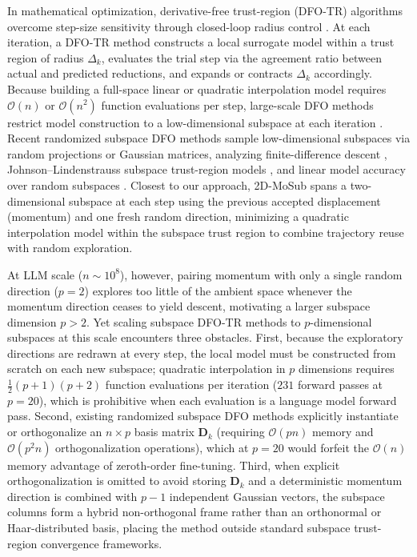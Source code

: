 \documentclass[smallextended]{svjour3}
\begin{document}
In mathematical optimization, derivative-free trust-region (DFO-TR) algorithms overcome step-size sensitivity through closed-loop radius control \cite{audet2017derivative,conn2000trust,conn2009introduction,Conn2009a,larson_menickelly_wild_2019,powell2006newuoa}. At each iteration, a DFO-TR method constructs a local surrogate model within a trust region of radius $\Delta_k$, evaluates the trial step via the agreement ratio between actual and predicted reductions, and expands or contracts $\Delta_k$ accordingly. Because building a full-space linear or quadratic interpolation model requires $\mathcal{O}(n)$ or $\mathcal{O}(n^2)$ function evaluations per step, large-scale DFO methods restrict model construction to a low-dimensional subspace at each iteration \cite{wang2006subspace,yuan2007subspace,yuan2014review}. Recent randomized subspace DFO methods sample low-dimensional subspaces via random projections or Gaussian matrices, analyzing finite-difference descent \cite{kozak2021stochastic,kozak2023zeroth}, Johnson--Lindenstrauss subspace trust-region models \cite{cartis2023scalable,cartis2024randomizedsubspacederivativefreeoptimization,dzahini2024stochastic}, and linear model accuracy over random subspaces \cite{hare2025expected,Menickelly2023}. Closest to our approach, 2D-MoSub \cite{xie2023twodimensional} spans a two-dimensional subspace at each step using the previous accepted displacement (momentum) and one fresh random direction, minimizing a quadratic interpolation model within the subspace trust region to combine trajectory reuse with random exploration.

At LLM scale ($n \sim 10^8$), however, pairing momentum with only a single random direction ($p=2$) explores too little of the ambient space whenever the momentum direction ceases to yield descent, motivating a larger subspace dimension $p > 2$. Yet scaling subspace DFO-TR methods to $p$-dimensional subspaces at this scale encounters three obstacles. First, because the exploratory directions are redrawn at every step, the local model must be constructed from scratch on each new subspace; quadratic interpolation in $p$ dimensions requires $\frac{1}{2}(p+1)(p+2)$ function evaluations per iteration ($231$ forward passes at $p=20$), which is prohibitive when each evaluation is a language model forward pass. Second, existing randomized subspace DFO methods \cite{cartis2023scalable,cartis2024randomizedsubspacederivativefreeoptimization,kozak2021stochastic} explicitly instantiate or orthogonalize an $n \times p$ basis matrix $\bm{D}_k$ (requiring $\mathcal{O}(pn)$ memory and $\mathcal{O}(p^2 n)$ orthogonalization operations), which at $p=20$ would forfeit the $\mathcal{O}(n)$ memory advantage of zeroth-order fine-tuning. Third, when explicit orthogonalization is omitted to avoid storing $\bm{D}_k$ and a deterministic momentum direction is combined with $p-1$ independent Gaussian vectors, the subspace columns form a hybrid non-orthogonal frame rather than an orthonormal or Haar-distributed basis, placing the method outside standard subspace trust-region convergence frameworks.
\end{document}
